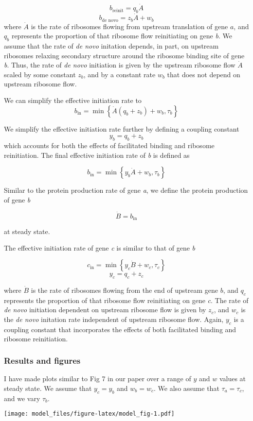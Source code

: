 \documentclass[]{article}
\begin{document}
\[b_\text{reinit} = q_b\dot{A}\] \[b_\text{de novo} = z_b\dot{A} + w_b\]
where \(\dot{A}\) is the rate of ribosomes flowing from upstream
translation of gene \(a\), and \(q_b\) represents the proportion of that
ribosome flow reinitiating on gene \emph{b}. We assume that the rate of
\emph{de novo} initation depends, in part, on upstream ribosomes
relaxing secondary structure around the ribosome binding site of gene
\emph{b}. Thus, the rate of \emph{de novo} initiation is given by the
upstream ribosome flow \(\dot{A}\) scaled by some constant \(z_b\), and
by a constant rate \(w_b\) that does not depend on upstream ribosome
flow.

We can simplify the effective initiation rate to
\[b_\text{in} = \min\left\{\dot{A}(q_b + z_b) + w_b, \tau_b\right\}\]

We simplify the effective initiation rate further by defining a coupling
constant \[
y_b = q_b + z_b
\] which accounts for both the effects of facilitated binding and
ribosome reinitiation. The final effective initiation rate of \emph{b}
is defined as

\[
b_\text{in} = \min\left\{y_b\dot{A} + w_b, \tau_b\right\}
\]

Similar to the protein production rate of gene \emph{a}, we define the
protein production of gene \emph{b}

\[ \dot{B} = b_\text{in} \]

at steady state.

The effective initiation rate of gene \emph{c} is similar to that of
gene \emph{b}

\[
c_\text{in} = \min\left\{y_c\dot{B} + w_c, \tau_c\right\}
\] \[
y_c = q_c + z_c
\]

where \(\dot{B}\) is the rate of ribosomes flowing from the end of
upstream gene \(b\), and \(q_c\) represents the proportion of that
ribosome flow reinitiating on gene \emph{c}. The rate of \emph{de novo}
initiation dependent on upstream ribosome flow is given by \(z_c\), and
\(w_c\) is the \emph{de novo} initation rate independent of upstream
ribosome flow. Again, \(y_c\) is a coupling constant that incorporates
the effects of both facilitated binding and ribosome reinitiation.

\subsubsection{Results and figures}\label{results-and-figures}

I have made plots similar to Fig 7 in our paper over a range of \(y\)
and \(w\) values at steady state. We assume that \(y_c = y_b\) and
\(w_b = w_c\). We also assume that \(\tau_a = \tau_c\), and we vary
\(\tau_b\).

\texttt{[image: model\_files/figure-latex/model\_fig-1.pdf]}
\end{document}
